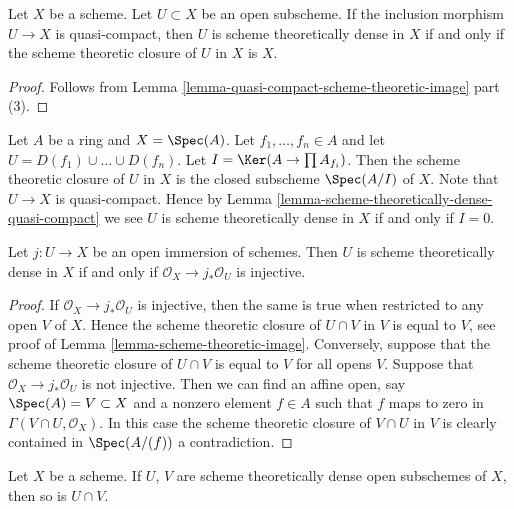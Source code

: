 \begin{lemma}
\label{lemma-scheme-theoretically-dense-quasi-compact}
Let $X$ be a scheme.
Let $U \subset X$ be an open subscheme.
If the inclusion morphism $U \to X$ is quasi-compact, then $U$
is scheme theoretically dense in $X$ if and only if the scheme theoretic
closure of $U$ in $X$ is $X$.
\end{lemma}

\begin{proof}
Follows from Lemma \ref{lemma-quasi-compact-scheme-theoretic-image} part (3).
\end{proof}

\begin{example}
\label{example-scheme-theoretic-closure}
Let $A$ be a ring and $X = \Spec(A)$.
Let $f_1, \ldots, f_n \in A$ and let $U = D(f_1) \cup \ldots \cup D(f_n)$.
Let $I = \Ker(A \to \prod A_{f_i})$.
Then the scheme theoretic closure of $U$ in $X$
is the closed subscheme $\Spec(A/I)$ of $X$.
Note that $U \to X$ is quasi-compact. Hence by
Lemma \ref{lemma-scheme-theoretically-dense-quasi-compact}
we see $U$ is scheme theoretically dense in $X$ if and only if $I = 0$.
\end{example}

\begin{lemma}
\label{lemma-characterize-scheme-theoretically-dense}
Let $j : U \to X$ be an open immersion of schemes.
Then $U$ is scheme theoretically dense in $X$ if and only if
$\mathcal{O}_X \to j_*\mathcal{O}_U$ is injective.
\end{lemma}

\begin{proof}
If $\mathcal{O}_X \to j_*\mathcal{O}_U$ is injective,
then the same is true when restricted to any open $V$ of $X$.
Hence the scheme theoretic closure of $U \cap V$ in $V$
is equal to $V$, see proof of Lemma \ref{lemma-scheme-theoretic-image}.
Conversely, suppose that the scheme theoretic
closure of $U \cap V$ is equal to $V$ for all opens $V$.
Suppose that $\mathcal{O}_X \to j_*\mathcal{O}_U$ is not injective.
Then we can find an affine open, say $\Spec(A) = V \subset X$
and a nonzero element $f \in A$ such that $f$ maps to zero in
$\Gamma(V \cap U, \mathcal{O}_X)$. In this case the scheme theoretic
closure of $V \cap U$ in $V$ is clearly contained in $\Spec(A/(f))$
a contradiction.
\end{proof}

\begin{lemma}
\label{lemma-intersection-scheme-theoretically-dense}
Let $X$ be a scheme. If $U$, $V$ are scheme theoretically dense
open subschemes of $X$, then so is $U \cap V$.
\end{lemma}

